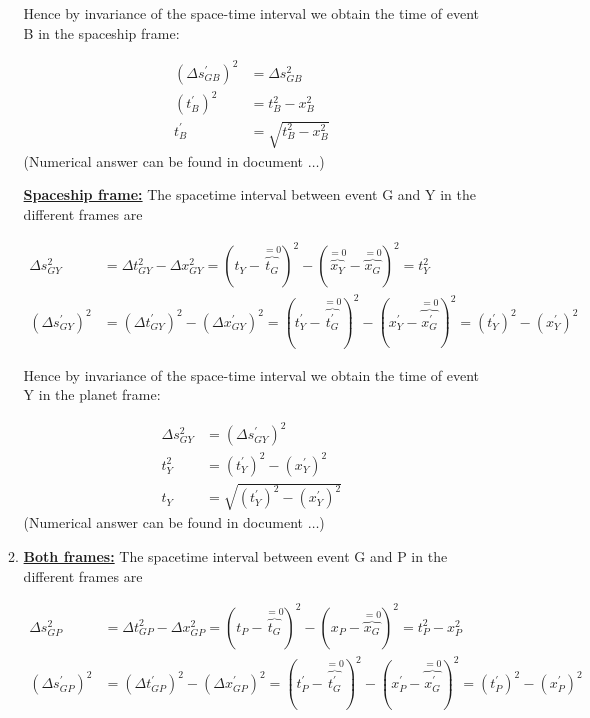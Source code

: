 \documentclass[a4paper,10pt,english]{article}
\begin{document}
\begin{enumerate}
\begin{enumerate}
Hence by invariance of the space-time interval we obtain the time of event B in the spaceship frame:

\begin{align}
(\Delta s_{GB}^{\prime})^2&=\Delta s_{GB}^2 \nonumber\\
(t_{B}^{\prime})^2&=t_{B}^2-x_{B}^2 \nonumber\\
t_{B}^{\prime}&=\sqrt{t_{B}^2-x_{B}^2} \label{eq:unknown_t_planet}
\end{align}
(Numerical answer can be found in document $\ldots$)

\underline{\bf{Spaceship frame:}} The spacetime interval between event G and Y in the different frames are

\begin{align*}
\Delta s_{GY}^2&=\Delta t_{GY}^2-\Delta x_{GY}^2=(t_{Y}-\overbrace{t_{G}}^{=0})^2-(\overbrace{x_{Y}}^{=0}-\overbrace{x_{G}}^{=0})^2=t_{Y}^2\\
(\Delta s_{GY}^{\prime})^2&=(\Delta t_{GY}^{\prime})^2-(\Delta x_{GY}^{\prime})^2=(t_{Y}^{\prime}-\overbrace{t_{G}^{\prime}}^{=0})^2-(x_{Y}^{\prime}-\overbrace{x_{G}^{\prime}}^{=0})^2=(t_{Y}^{\prime})^2-(x_{Y}^{\prime})^2
\end{align*}

Hence by invariance of the space-time interval we obtain the time of event Y in the planet frame:

\begin{align}
\Delta s_{GY}^2&=(\Delta s_{GY}^{\prime})^2 \nonumber\\
t_{Y}^{2}&=(t^{\prime}_{Y})^{2}-(x^{\prime}_{Y})^{2} \nonumber\\%
t_{Y}&=\sqrt{(t^{\prime}_{Y})^{2}-(x^{\prime}_{Y})^{2}} \label{eq:unknown_t_spaceship}%
\end{align}
(Numerical answer can be found in document $\ldots$)
\item \underline{\bf{Both frames:}} The spacetime interval between event G and P in the different frames are

\begin{align*}
\Delta s_{GP}^2&=\Delta t_{GP}^2-\Delta x_{GP}^2=(t_{P}-\overbrace{t_{G}}^{=0})^2-(x_{P}-\overbrace{x_{G}}^{=0})^2=t_{P}^2-x_{P}^2\\
(\Delta s_{GP}^{\prime})^2&=(\Delta t_{GP}^{\prime})^2-(\Delta x_{GP}^{\prime})^2=(t_{P}^{\prime}-\overbrace{t^{\prime}_{G}}^{=0})^2-(x_{P}^{\prime}-\overbrace{x^{\prime}_{G}}^{=0})^2=(t_{P}^{\prime})^2-(x_{P}^{\prime})^2
\end{align*}


\end{enumerate}
\end{enumerate}
\end{document}
